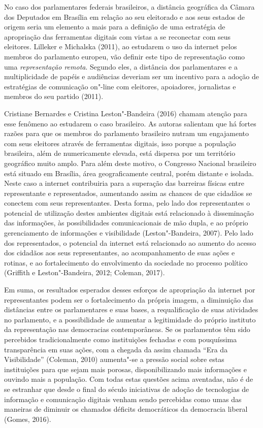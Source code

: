 No caso dos parlamentares federais brasileiros, a distância geográfica
da Câmara dos Deputados em Brasília em relação ao seu eleitorado e aos
seus estados de origem seria um elemento a mais para a definição de uma
estratégia de apropriação das ferramentas digitais com vistas a se
reconectar com seus eleitores. Lilleker e Michalska (2011), ao estudarem
o uso da internet pelos membros do parlamento europeu, vão definir este
tipo de representação como uma \emph{representação remota}. Segundo
eles, a distância dos parlamentares e a multiplicidade de papéis e
audiências deveriam ser um incentivo para a adoção de estratégias de
comunicação on"-line com eleitores, apoiadores, jornalistas e membros do
seu partido (2011).

Cristiane Bernardes e Cristina Leston"-Bandeira (2016) chamam atenção
para esse fenômeno ao estudarem o caso brasileiro. As autoras salientam
que há fortes razões para que os membros do parlamento brasileiro nutram
um engajamento com seus eleitores através de ferramentas digitais, isso
porque a população brasileira, além de numericamente elevada, está
dispersa por um território geográfico muito amplo. Para além deste
motivo, o Congresso Nacional brasileiro está situado em Brasília, área
geograficamente central, porém distante e isolada. Neste caso a internet
contribuiria para a superação das barreiras físicas entre representante
e representados, aumentando assim as chances de que cidadãos se conectem
com seus representantes. Desta forma, pelo lado dos representantes o
potencial de utilização destes ambientes digitais está relacionado à
disseminação das informações, às possibilidades comunicacionais de mão
dupla, e ao próprio gerenciamento de informações e visibilidade
(Leston"-Bandeira, 2007). Pelo lado dos representados, o potencial da
internet está relacionado ao aumento do acesso dos cidadãos aos seus
representantes, ao acompanhamento de suas ações e rotinas, e ao
fortalecimento do envolvimento da sociedade no processo político
(Griffith e Leston"-Bandeira, 2012; Coleman, 2017).

Em suma, os resultados esperados desses esforços de apropriação da
internet por representantes podem ser o fortalecimento da própria
imagem, a diminuição das distâncias entre os parlamentares e suas bases,
a requalificação de suas atividades no parlamento, e a possibilidade de
aumentar a legitimidade do próprio instituto da representação nas
democracias contemporâneas. Se os parlamentos têm sido percebidos
tradicionalmente como instituições fechadas e com pouquíssima
transparência em suas ações, com a chegada da assim chamada ``Era da
Visibilidade'' (Coleman, 2010) aumenta"-se a pressão social sobre estas
instituições para que sejam mais porosas, disponibilizando mais
informações e ouvindo mais a população. Com todas estas questões acima
aventadas, não é de se estranhar que desde o final do século 
iniciativas de adoção de tecnologias de informação e comunicação
digitais venham sendo percebidas como umas das maneiras de diminuir os
chamados déficits democráticos da democracia liberal (Gomes, 2016).


